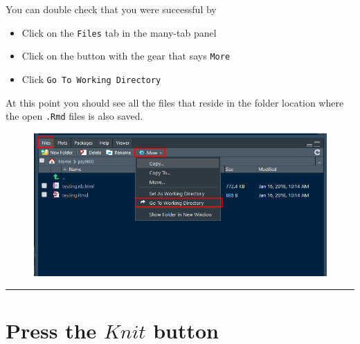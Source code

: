 \documentclass[]{book}
\providecommand{\tightlist}{%
  \setlength{\itemsep}{0pt}\setlength{\parskip}{0pt}}
\theoremstyle{definition}
\theoremstyle{definition}
\theoremstyle{definition}
\theoremstyle{remark}
\begin{document}
You can double check that you were successful by

\begin{itemize}
\tightlist
\item
  Click on the \texttt{Files} tab in the many-tab panel
\item
  Click on the button with the gear that says \texttt{More}
\item
  Click \texttt{Go\ To\ Working\ Directory}
\end{itemize}

At this point you should see all the files that reside in the folder
location where the open \texttt{.Rmd} files is also saved.

\begin{figure}
\centering
\includegraphics{img/files_goto_wd.png}
\caption{}
\end{figure}

\begin{center}\rule{0.5\linewidth}{\linethickness}\end{center}

\section{\texorpdfstring{Press the \(Knit\)
button}{Press the Knit button}}\label{press-the-knit-button}


\end{document}
